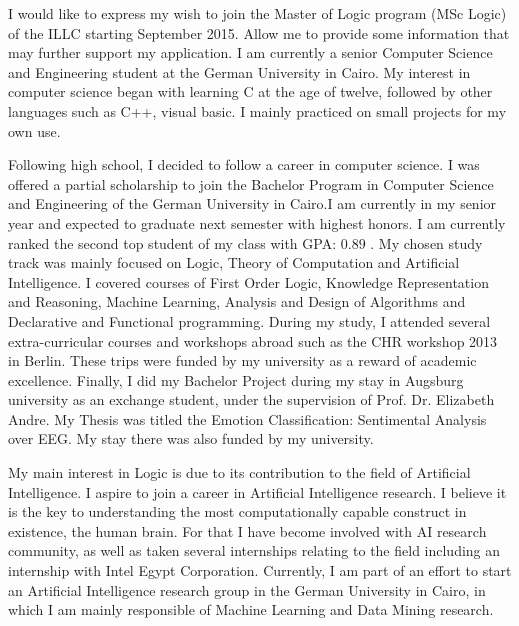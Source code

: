\documentclass[10pt,stdletter,dateno,sigleft]{newlfm} %
\begin{document}
\begin{newlfm}


  I would like to express my wish to join the Master of Logic program (MSc
  Logic) of the ILLC starting September 2015.
  Allow me to provide some information that may further support my application.
  I am currently a senior Computer Science and Engineering student at the German
  University in Cairo. My interest in computer science began with learning C at the age of twelve,
  followed by other languages such as C++, visual basic. I mainly practiced on
  small projects for my own use.  

  Following high school, I decided to follow a career in computer science. I was
  offered a partial scholarship to join the Bachelor Program in Computer Science
  and Engineering of the German University in Cairo.I am currently in my senior
  year and expected to graduate next semester with highest honors. I am
  currently ranked the second top student of my class with GPA: $0.89$ . My
  chosen study track was mainly focused on Logic,  Theory of Computation and
  Artificial Intelligence. I covered courses of First Order Logic,  Knowledge
  Representation and Reasoning, Machine Learning,  Analysis and Design of
  Algorithms and Declarative and Functional
  programming. During my study, I attended several extra-curricular courses and
  workshops abroad such as the CHR workshop 2013 in Berlin. These trips were
  funded by my university as a reward of academic excellence. Finally, I did my
  Bachelor Project during my stay in Augsburg university as an exchange student,
  under the supervision of Prof. Dr. Elizabeth Andre. My Thesis was titled the
  Emotion Classification: Sentimental Analysis over EEG. My stay there was also
  funded by my university.
  
  My main interest in Logic is due to its contribution to the field of
  Artificial Intelligence. I aspire to join a career in Artificial Intelligence
  research. I believe it is the key to understanding the most computationally
  capable construct in existence, the human brain. For that I have become
  involved with AI research community, as well as taken several internships
  relating to the field including an internship with Intel Egypt Corporation.
  Currently, I am part of an effort to start an Artificial Intelligence research
  group in the German University in Cairo, in which I am mainly responsible of
  Machine Learning and Data Mining research.


\end{newlfm}
\end{document}
